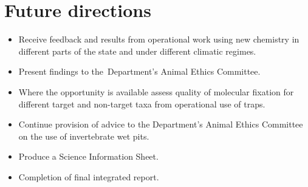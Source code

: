 \documentclass[version=last,
    paper=a4, %
    10pt, %
    usenames,
    dvipsnames,
    oneside, %
    headings=openany, %
    DIV=15 %
]{scrbook}
\begin{document}
\section*{Future directions}
\begin{itemize}
\itemsep1pt\parskip0pt
\item
  Receive feedback and results from operational work using new chemistry
  in different parts of the state and under different climatic regimes.
\item
  Present findings to the~Department's Animal Ethics Committee.
\item
  Where the opportunity is available assess quality of molecular
  fixation for different target and non-target taxa from operational use
  of traps. ~
\item
  Continue provision of advice to the Department's Animal Ethics
  Committee on the use of invertebrate wet pits.
\item
  Produce a Science Information Sheet.
\item
  Completion of final integrated report.
\end{itemize}



\end{document}
